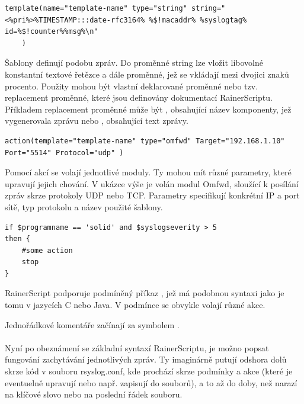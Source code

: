 \documentclass[thesis=B,czech]{FITthesis}[2012/06/26]
\begin{document}
\begin{lstlisting}[style=RainerScriptSimpleStyle]
template(name="template-name" type="string" string="<%pri%>%TIMESTAMP:::date-rfc3164% %$!macaddr% %syslogtag% id=%$!counter%%msg%\n"
	)
\end{lstlisting}
Šablony definují podobu zpráv. Do proměnné string lze vložit libovolné konstantní textové řetězce a dále proměnné, jež se vkládají mezi dvojici znaků procento. Použity mohou být vlastní deklarované proměnné nebo tzv. replacement proměnné, které jsou definovány dokumentací RainerScriptu. Příkladem replacement proměnné může být , obsahující název komponenty, jež vygenerovala zprávu nebo , obsahující text zprávy. 

\begin{lstlisting}[style=RainerScriptSimpleStyle]
action(template="template-name" type="omfwd" Target="192.168.1.10" Port="5514" Protocol="udp" )
\end{lstlisting}

Pomocí akcí se volají jednotlivé moduly. Ty mohou mít různé parametry, které upravují jejich chování. V ukázce výše je volán modul Omfwd, sloužící k posílání zpráv skrze protokoly UDP nebo TCP. Parametry specifikují konkrétní IP a port sítě, typ protokolu a název použité šablony.

\begin{lstlisting}[style=RainerScriptSimpleStyle]
if $programname == 'solid' and $syslogseverity > 5
then {
	#some action
	stop
}
\end{lstlisting}
	
RainerScript podporuje podmíněný příkaz , jež má podobnou syntaxi jako je tomu v jazycích C nebo Java.
V podmínce  se obvykle volají různé akce.

Jednořádkové komentáře začínají za symbolem \uv{\#}.
\\
\\
Nyní po obeznámení se základní syntaxí RainerScriptu, je možno popsat fungování zachytávání jednotlivých zpráv. Ty imaginárně putují odshora dolů skrze kód v souboru rsyslog.conf, kde prochází skrze podmínky a akce (které je eventuelně upravují nebo např. zapisují do souborů), a to až do doby, než narazí na klíčové slovo  nebo na poslední řádek souboru.
\end{document}
